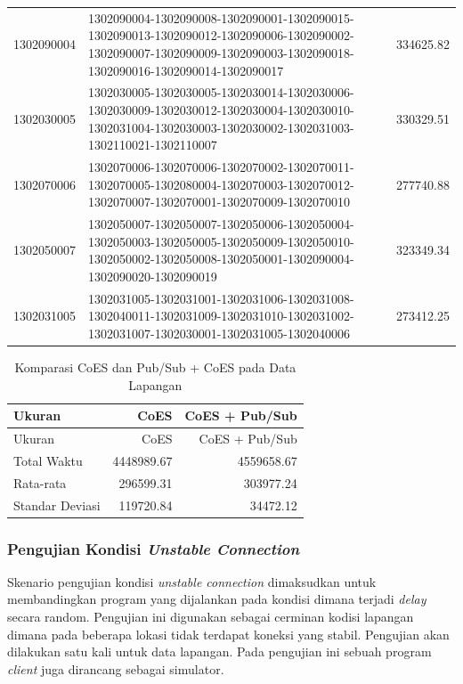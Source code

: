 \begin{longtable}[h]{lp{8cm}r}
		1302090004 & 1302090004-1302090008-1302090001-1302090015-1302090013-1302090012-1302090006-1302090002-1302090007-1302090009-1302090003-1302090018-1302090016-1302090014-1302090017 & 334625.82 \\
		1302030005 & 1302030005-1302030005-1302030014-1302030006-1302030009-1302030012-1302030004-1302030010-1302031004-1302030003-1302030002-1302031003-1302110021-1302110007 & 330329.51 \\
		1302070006 & 1302070006-1302070006-1302070002-1302070011-1302070005-1302080004-1302070003-1302070012-1302070007-1302070001-1302070009-1302070010 & 277740.88 \\
		1302050007 & 1302050007-1302050007-1302050006-1302050004-1302050003-1302050005-1302050009-1302050010-1302050002-1302050008-1302050001-1302090004-1302090020-1302090019 & 323349.34 \\
		1302031005 & 1302031005-1302031001-1302031006-1302031008-1302040011-1302031009-1302031010-1302031002-1302031007-1302030001-1302031005-1302040006 & 273412.25 \\
\end{longtable}


\begin{longtable}[h]{lrr}
	\caption{Komparasi CoES dan Pub/Sub + CoES pada Data Lapangan}
	\label{tbl:test_result_normal_field_comparison}\\
	\toprule
		Ukuran & CoES & CoES + Pub/Sub\\ 
	\midrule
	\endfirsthead
	\toprule
		Ukuran & CoES & CoES + Pub/Sub\\ 
	\midrule
	\endhead
	\bottomrule
	\endfoot
		Total Waktu & 4448989.67 & 4559658.67\\
		Rata-rata & 296599.31 & 303977.24\\
		Standar Deviasi & 119720.84 & 34472.12\\
\end{longtable}


\subsubsection{Pengujian Kondisi \textit{Unstable Connection}}
Skenario pengujian kondisi \textit{unstable connection} dimaksudkan untuk membandingkan program yang dijalankan pada kondisi dimana terjadi \textit{delay} secara random. Pengujian ini digunakan sebagai cerminan kodisi lapangan dimana pada beberapa lokasi tidak terdapat koneksi yang stabil. Pengujian akan dilakukan satu kali untuk data lapangan. Pada pengujian ini sebuah program \textit{client} juga dirancang sebagai simulator.


